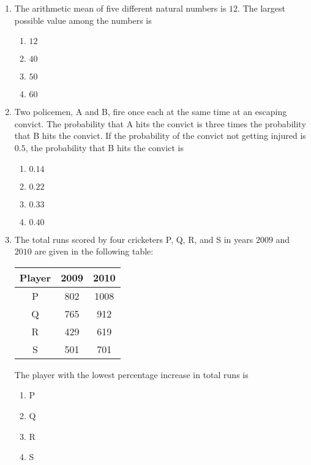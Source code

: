 \documentclass[journal,12pt,twocolumn]{IEEEtran}
\theoremstyle{remark}
\begin{document}
\begin{enumerate}[start=53]
    \item The arithmetic mean of five different natural numbers is $12$. The largest possible value among the numbers is
    \begin{enumerate}
        \item $12$
        \item $40$
        \item $50$
        \item $60$
    \end{enumerate}

    \item Two policemen, A and B, fire once each at the same time at an escaping convict. The probability that A hits the convict is three times the probability that B hits the convict. If the probability of the convict not getting injured is $0.5$, the probability that B hits the convict is
    \begin{enumerate}
        \item $0.14$
        \item $0.22$
        \item $0.33$
        \item $0.40$
    \end{enumerate}

    \item The total runs scored by four cricketers P, Q, R, and S in years $2009$ and $2010$ are given in the following table:
    
    \begin{center}
    \begin{tabular}{|c|c|c|}
        \hline
        Player & 2009 & 2010 \\
        \hline
        P & 802 & 1008 \\
        Q & 765 & 912 \\
        R & 429 & 619 \\
        S & 501 & 701 \\
        \hline
    \end{tabular}
    \end{center}

    The player with the lowest percentage increase in total runs is
    \begin{enumerate}
        \item P
        \item Q
        \item R
        \item S
    \end{enumerate}


\end{enumerate}
\end{document}
